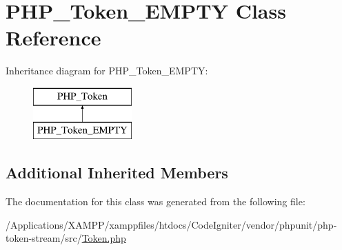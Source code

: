 \hypertarget{class_p_h_p___token___e_m_p_t_y}{}\section{P\+H\+P\+\_\+\+Token\+\_\+\+E\+M\+P\+TY Class Reference}
\label{class_p_h_p___token___e_m_p_t_y}
Inheritance diagram for P\+H\+P\+\_\+\+Token\+\_\+\+E\+M\+P\+TY\+:\begin{figure}[H]
\begin{center}
\leavevmode
\includegraphics[height=2.000000cm]{class_p_h_p___token___e_m_p_t_y}
\end{center}
\end{figure}
\subsection*{Additional Inherited Members}


The documentation for this class was generated from the following file\+:\begin{DoxyCompactItemize}
\item 
/\+Applications/\+X\+A\+M\+P\+P/xamppfiles/htdocs/\+Code\+Igniter/vendor/phpunit/php-\/token-\/stream/src/\mbox{\hyperlink{_token_8php}{Token.\+php}}\end{DoxyCompactItemize}
